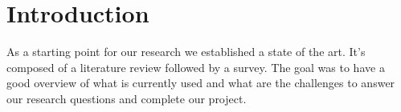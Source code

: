 \section{Introduction}\label{sec:stintro}

As a starting point for our research we established a state of the art.
It's composed of a literature review followed by a survey.
The goal was to have a good overview of what is currently used and what are the challenges to
answer our research questions and complete our project.